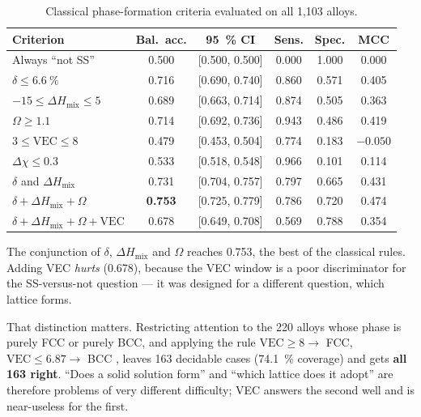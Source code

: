 \documentclass[11pt]{article}
\begin{document}
\begin{table}[t]
\centering
\caption{Classical phase-formation criteria evaluated on all 1{,}103 alloys.}
\label{tab:criteria}
\small
\begin{tabular}{lccccc}
\toprule
Criterion & Bal.\ acc. & \SI{95}{\percent} CI & Sens. & Spec. & MCC \\
\midrule
Always ``not SS''            & 0.500 & [0.500, 0.500] & 0.000 & 1.000 & 0.000 \\
$\delta \le \SI{6.6}{\percent}$ & 0.716 & [0.690, 0.740] & 0.860 & 0.571 & 0.405 \\
$-15 \le \Delta H_{\mathrm{mix}} \le 5$ & 0.689 & [0.663, 0.714] & 0.874 & 0.505 & 0.363 \\
$\Omega \ge 1.1$             & 0.714 & [0.692, 0.736] & 0.943 & 0.486 & 0.419 \\
$3 \le \mathrm{VEC} \le 8$   & 0.479 & [0.453, 0.504] & 0.774 & 0.183 & $-0.050$ \\
$\Delta\chi \le 0.3$         & 0.533 & [0.518, 0.548] & 0.966 & 0.101 & 0.114 \\
$\delta$ and $\Delta H_{\mathrm{mix}}$ & 0.731 & [0.704, 0.757] & 0.797 & 0.665 & 0.431 \\
$\delta + \Delta H_{\mathrm{mix}} + \Omega$ & \textbf{0.753} & [0.725, 0.779] & 0.786 & 0.720 & 0.474 \\
$\delta + \Delta H_{\mathrm{mix}} + \Omega + \mathrm{VEC}$ & 0.678 & [0.649, 0.708] & 0.569 & 0.788 & 0.354 \\
\bottomrule
\end{tabular}
\end{table}

The conjunction of $\delta$, $\Delta H_{\mathrm{mix}}$ and $\Omega$ reaches 0.753, the best of the classical rules. Adding VEC \emph{hurts} (0.678), because the VEC window is a poor discriminator for the SS-versus-not question --- it was designed for a different question, which lattice forms.

That distinction matters. Restricting attention to the 220 alloys whose phase is purely FCC or purely BCC, and applying the rule $\mathrm{VEC} \ge 8 \rightarrow$ FCC, $\mathrm{VEC} \le 6.87 \rightarrow$ BCC \cite{guo2011}, leaves 163 decidable cases (\SI{74.1}{\percent} coverage) and gets \textbf{all 163 right}. ``Does a solid solution form'' and ``which lattice does it adopt'' are therefore problems of very different difficulty; VEC answers the second well and is near-useless for the first.
\end{document}
